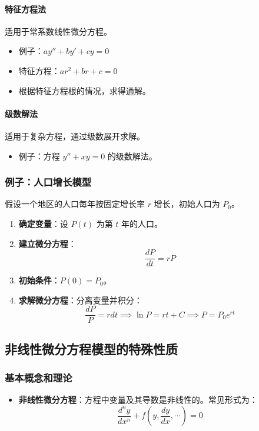 \documentclass[UTF8]{ctexart}
\begin{document}
\paragraph{特征方程法}
适用于常系数线性微分方程。
\begin{itemize}
    \item 例子：\( ay'' + by' + cy = 0 \)
    \item 特征方程：\( ar^2 + br + c = 0 \)
    \item 根据特征方程根的情况，求得通解。
\end{itemize}

\paragraph{级数解法}
适用于复杂方程，通过级数展开求解。
\begin{itemize}
    \item 例子：方程 \( y'' + xy = 0 \) 的级数解法。
\end{itemize}

\subsubsection {例子：人口增长模型}
假设一个地区的人口每年按固定增长率 \( r \) 增长，初始人口为 \( P_0 \)。
\begin{enumerate}
    \item \textbf{确定变量}：设 \( P(t) \) 为第 \( t \) 年的人口。
    \item \textbf{建立微分方程}：
    \[
    \frac{dP}{dt} = rP
    \]
    \item \textbf{初始条件}：\( P(0) = P_0 \)。
    \item \textbf{求解微分方程}：分离变量并积分：
    \[
    \frac{dP}{P} = r dt \implies \ln P = rt + C \implies P = P_0 e^{rt}
    \]
\end{enumerate}

\subsection {非线性微分方程模型的特殊性质}
\subsubsection {基本概念和理论}
\begin{itemize}
    \item \textbf{非线性微分方程}：方程中变量及其导数是非线性的。常见形式为：
    \[
    \frac{d^n y}{dx^n} + f(y, \frac{dy}{dx}, \cdots) = 0
    \]
\end{itemize}
\end{document}
